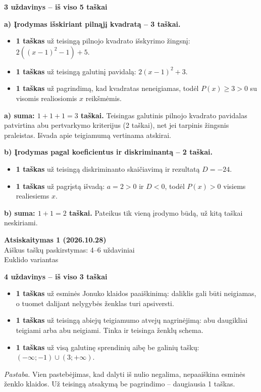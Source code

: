 \documentclass[11pt]{article}
\newcommand{\antraste}[1]{\begin{center}\Large\textbf{Atsiskaitymas 1 (2026.10.28)}\\\large #1\\\normalsize Euklido variantas\end{center}}
\newcommand{\sk}[1]{\par\medskip\textbf{#1}\par}
\begin{document}
\begin{center}\end{center}
\sk{3 uždavinys -- iš viso 5 taškai}
\textbf{a) Įrodymas išskiriant pilnąjį kvadratą -- 3 taškai.}
\begin{itemize}
\item \textbf{1 taškas} už teisingą pilnojo kvadrato išskyrimo žingsnį:
$2((x-1)^2-1)+5$.
\item \textbf{1 taškas} už teisingą galutinį pavidalą:
$2(x-1)^2+3$.
\item \textbf{1 taškas} už pagrindimą, kad kvadratas neneigiamas, todėl
$P(x)\ge3>0$ su visomis realiosiomis $x$ reikšmėmis.
\end{itemize}
\textbf{a) suma: $1+1+1=3$ taškai.} Teisingas galutinis pilnojo kvadrato pavidalas patvirtina abu pertvarkymo kriterijus (2 taškai), net jei tarpinis žingsnis praleistas. Išvada apie teigiamumą vertinama atskirai.

\textbf{b) Įrodymas pagal koeficientus ir diskriminantą -- 2 taškai.}
\begin{itemize}
\item \textbf{1 taškas} už teisingą diskriminanto skaičiavimą ir rezultatą $D=-24$.
\item \textbf{1 taškas} už pagrįstą išvadą: $a=2>0$ ir $D<0$, todėl $P(x)>0$ visiems realiesiems $x$.
\end{itemize}
\textbf{b) suma: $1+1=2$ taškai.} Pateikus tik vieną įrodymo būdą, už kitą taškai neskiriami.

\begin{center}\end{center}
\newpage
\antraste{Aiškus taškų paskirstymas: 4--6 uždaviniai}
\sk{4 uždavinys -- iš viso 3 taškai}
\begin{itemize}
\item \textbf{1 taškas} už esminės Jonuko klaidos paaiškinimą: daliklis gali būti neigiamas, o tuomet dalijant nelygybės ženklas turi apsiversti.
\item \textbf{1 taškas} už teisingą abiejų teigiamumo atvejų nagrinėjimą: abu daugikliai teigiami arba abu neigiami. Tinka ir teisinga ženklų schema.
\item \textbf{1 taškas} už visą galutinę sprendinių aibę be galinių taškų:
$(-\infty;-1)\cup(3;+\infty)$.
\end{itemize}
\textit{Pastaba.} Vien pastebėjimas, kad dalyti iš nulio negalima, nepaaiškina esminės ženklo klaidos. Už teisingą atsakymą be pagrindimo -- daugiausia 1 taškas.
\begin{center}\end{center}
\end{document}
